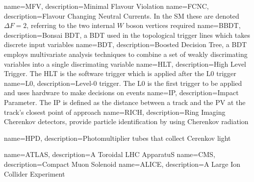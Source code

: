                  {
                   name=MFV,
                   description={Minimal Flavour Violation}
                 }
                 {
                   name=FCNC,
                   description={Flavour Changing Neutral Currents. In the \Gls{SM} these are denoted $\Delta F = 2$, referring to the two internal $W$ boson vertices required}}
                 {
                   name=BBDT,
                   description={Bonsai BDT, a BDT used in the topological trigger lines which takes discrete input variables}}
                 {
                   name=BDT,
                   description={Boosted Decision Tree, a BDT employs multivariate analysis techniques to combine a set of weakly discrimating variables into a single discrimating variable}}                   
                 {
                   name=HLT,
                   description={High Level Trigger. The HLT is the software trigger which is applied after the \Gls{L0} trigger}}
                 {
                   name=L0,
                   description={Level-0 trigger. The L0 is the first trigger to be applied and uses hardware to make decisions on events  }}                   
                 {
                   name=IP,
                   description={Impact Parameter. The IP is defined as the distance between a track and the \Gls{PV} at the track's closest point of approach }}                                                                        
                 {
                   name=RICH,
                   description={Ring Imaging Cherenkov detectors, provide particle identification by using Cherenkov radiation}                         
                 }

		{
		name=HPD,
		description={Photomultiplier tubes that collect Cerenkov light}
		}
                 
                 {
                   name=ATLAS,
                   description={A Toroidal LHC ApparatuS}
                 }
                 {
                   name=CMS,
                   description={Compact Muon Solenoid}
                 }
                 {
                   name=ALICE,
                   description={A Large Ion Collider Experiment}
                 }

